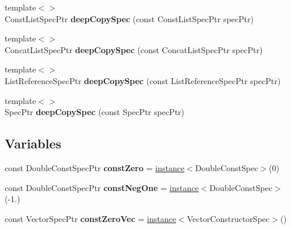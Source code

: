 \begin{DoxyCompactItemize}
\item 
\hypertarget{namespacegiskard__suturo_ab51af9bd062883a15278095a8bce0ca8}{{\footnotesize template$<$$>$ }\\Const\-List\-Spec\-Ptr {\bfseries deep\-Copy\-Spec} (const Const\-List\-Spec\-Ptr spec\-Ptr)}\label{namespacegiskard__suturo_ab51af9bd062883a15278095a8bce0ca8}

\item 
\hypertarget{namespacegiskard__suturo_acef430239aa3c9505df2f1d69e3f36a8}{{\footnotesize template$<$$>$ }\\Concat\-List\-Spec\-Ptr {\bfseries deep\-Copy\-Spec} (const Concat\-List\-Spec\-Ptr spec\-Ptr)}\label{namespacegiskard__suturo_acef430239aa3c9505df2f1d69e3f36a8}

\item 
\hypertarget{namespacegiskard__suturo_ab8b1a3daef6a6bb00f15c1733d50ba5e}{{\footnotesize template$<$$>$ }\\List\-Reference\-Spec\-Ptr {\bfseries deep\-Copy\-Spec} (const List\-Reference\-Spec\-Ptr spec\-Ptr)}\label{namespacegiskard__suturo_ab8b1a3daef6a6bb00f15c1733d50ba5e}

\item 
\hypertarget{namespacegiskard__suturo_ae60b92d481f910f3591f43600d1e5ef1}{{\footnotesize template$<$$>$ }\\Spec\-Ptr {\bfseries deep\-Copy\-Spec} (const Spec\-Ptr spec\-Ptr)}\label{namespacegiskard__suturo_ae60b92d481f910f3591f43600d1e5ef1}

\end{DoxyCompactItemize}
\subsection*{Variables}
\begin{DoxyCompactItemize}
\item 
\hypertarget{namespacegiskard__suturo_a44dba5c4708369bba83963959de2590e}{const Double\-Const\-Spec\-Ptr {\bfseries const\-Zero} = \hyperlink{namespacegiskard__suturo_af5bbc7ef4d715f8370eaaa74109fa6b8}{instance}$<$Double\-Const\-Spec$>$(0)}\label{namespacegiskard__suturo_a44dba5c4708369bba83963959de2590e}

\item 
\hypertarget{namespacegiskard__suturo_a02dea102852ab45f740c82f36c80180c}{const Double\-Const\-Spec\-Ptr {\bfseries const\-Neg\-One} = \hyperlink{namespacegiskard__suturo_af5bbc7ef4d715f8370eaaa74109fa6b8}{instance}$<$Double\-Const\-Spec$>$(-\/1.)}\label{namespacegiskard__suturo_a02dea102852ab45f740c82f36c80180c}

\item 
\hypertarget{namespacegiskard__suturo_a21c23e5fb9d0889c72e3cddec25382f4}{const Vector\-Spec\-Ptr {\bfseries const\-Zero\-Vec} = \hyperlink{namespacegiskard__suturo_af5bbc7ef4d715f8370eaaa74109fa6b8}{instance}$<$Vector\-Constructor\-Spec$>$()}\label{namespacegiskard__suturo_a21c23e5fb9d0889c72e3cddec25382f4}

\end{DoxyCompactItemize}


